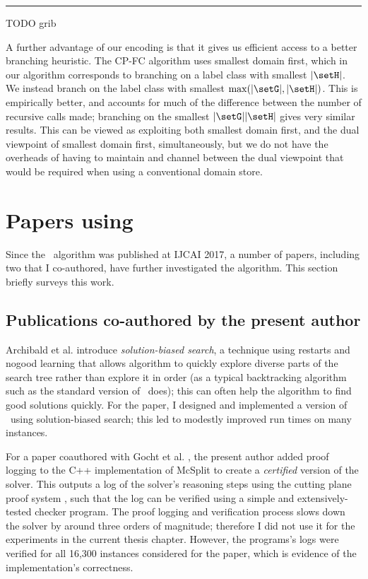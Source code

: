 \hrule

TODO grib

A further advantage of our encoding is that it gives us efficient access to a
better branching heuristic. The CP-FC algorithm uses smallest domain first,
which in our algorithm corresponds to branching on a label class with smallest
$|\setH|$. We instead branch on the label class with smallest $\max(|\setG|,|\setH|)$.
This is empirically better, and accounts for much of the difference between
the number of recursive calls made; branching on the smallest $|\setG| |\setH|$ gives
very similar results. This can be viewed as exploiting both smallest domain first,
and the dual viewpoint \citep{DBLP:conf/ecai/Geelen92} of smallest domain
first, simultaneously, but we do not have the overheads of having to maintain
and channel between the dual viewpoint that would be required when using a
conventional domain store.

\section{Papers using \McSplit}\label{sec:mcsplit-papers}

Since the \McSplit\ algorithm was published at IJCAI 2017, a number of papers, including
two that I co-authored, have further investigated the algorithm.
This section briefly surveys this work.

\subsection{Publications co-authored by the present author}

Archibald et al. \cite{DBLP:conf/cpaior/ArchibaldDHMP019} introduce \emph{solution-biased search},
a technique using restarts and nogood learning that allows algorithm to quickly explore diverse
parts of the search tree rather than explore it in order (as a typical backtracking algorithm
such as the standard version of \McSplit\ does); this can often help the algorithm to find good
solutions quickly.  For the paper, I designed and implemented a version
of \McSplit\ using solution-biased search; this led to modestly improved run times on many instances.

For a paper coauthored with Gocht et al. \cite{DBLP:conf/cp/GochtMMNPT20}, the present
author added proof logging \cite{DBLP:conf/ijcai/GochtMN20} to the C++ implementation of
McSplit to create a \emph{certified} version of the solver.  This outputs a log of the
solver's reasoning steps using the cutting plane proof system
\cite{DBLP:journals/dam/CookCT87}, such that the log can be verified using a
simple and extensively-tested checker program.  The proof logging and verification process
slows down the solver by around three orders of magnitude; therefore I did not use it for
the experiments in the current thesis chapter.  However, the programs's logs were verified
for all 16,300 instances considered for the paper, which is evidence of the implementation's
correctness.

